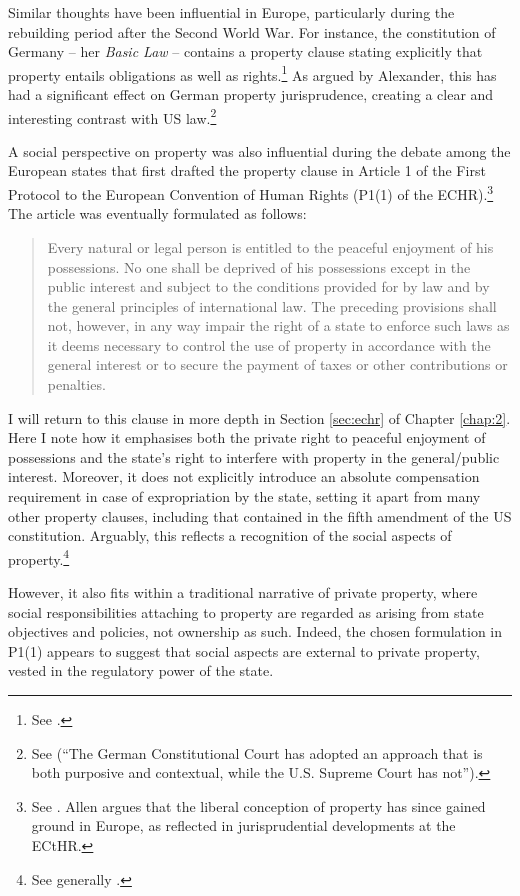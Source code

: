 Similar thoughts have been influential in Europe, particularly during the rebuilding period after the Second World War. For instance, the constitution of Germany -- her {\it Basic Law} -- contains a property clause stating explicitly that property entails obligations as well as rights.\footnote{See \cite[14]{basic49}.} As argued by Alexander, this has had a significant effect on German property jurisprudence, creating a clear and interesting contrast with US law.\footnote{See \cite[738]{alexander03} (``The German Constitutional Court has adopted an approach that is both purposive and contextual, while the U.S. Supreme Court has not'').}

A social perspective on property was also influential during the debate among the European states that first drafted the property clause in Article 1 of the First Protocol to the European Convention of Human Rights (P1(1) of the ECHR).\footnote{See \cite[1063-1065]{allen10}. Allen argues that the liberal conception of property has since gained ground in Europe, as reflected in jurisprudential developments at the ECtHR.} The article was eventually formulated as follows:

\begin{quote} Every natural or legal person is entitled to the peaceful enjoyment of his possessions. No one shall be deprived of his possessions except in the public interest and subject to the conditions provided for by law and by the general principles of international law.
\indent The preceding provisions shall not, however, in any way impair the right of a state to enforce such laws as it deems necessary to control the use of property in accordance with the general interest or to secure the payment of taxes or other contributions or penalties.
\end{quote}

I will return to this clause in more depth in Section \ref{sec:echr} of Chapter \ref{chap:2}. Here I note how it emphasises both the private right to peaceful enjoyment of possessions and the state's right to interfere with property in the general/public interest. Moreover, it does not explicitly introduce an absolute compensation requirement in case of expropriation by the state, setting it apart from many other property clauses, including that contained in the fifth amendment of the US constitution. Arguably, this reflects a recognition of the social aspects of property.\footnote{See generally \cite{allen10}.}

However, it also fits within a traditional narrative of private property, where social responsibilities attaching to property are regarded as arising from state objectives and policies, not ownership as such. Indeed, the chosen formulation in P1(1) appears to suggest that social aspects are external to private property, vested in the regulatory power of the state. 

